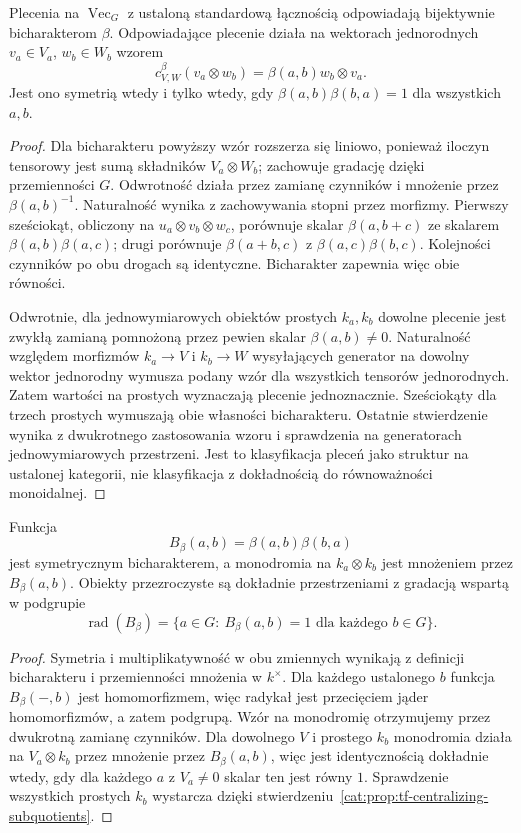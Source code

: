 \begin{twierdzenie}\label{cat:thm:tf-vec-braiding}
Plecenia na $\operatorname{Vec}_G$ z ustaloną standardową łącznością odpowiadają bijektywnie bicharakterom $\beta$. Odpowiadające plecenie działa na wektorach jednorodnych $v_a\in V_a$, $w_b\in W_b$ wzorem
\[
 c_{V,W}^{\beta}(v_a\otimes w_b)=\beta(a,b)w_b\otimes v_a.
\]
Jest ono symetrią wtedy i tylko wtedy, gdy $\beta(a,b)\beta(b,a)=1$ dla wszystkich $a,b$.
\end{twierdzenie}
\begin{proof}
Dla bicharakteru powyższy wzór rozszerza się liniowo, ponieważ iloczyn tensorowy jest sumą składników $V_a\otimes W_b$; zachowuje gradację dzięki przemienności $G$. Odwrotność działa przez zamianę czynników i mnożenie przez $\beta(a,b)^{-1}$. Naturalność wynika z zachowywania stopni przez morfizmy. Pierwszy sześciokąt, obliczony na $u_a\otimes v_b\otimes w_c$, porównuje skalar $\beta(a,b+c)$ ze skalarem $\beta(a,b)\beta(a,c)$; drugi porównuje $\beta(a+b,c)$ z $\beta(a,c)\beta(b,c)$. Kolejności czynników po obu drogach są identyczne. Bicharakter zapewnia więc obie równości.

Odwrotnie, dla jednowymiarowych obiektów prostych $k_a,k_b$ dowolne plecenie jest zwykłą zamianą pomnożoną przez pewien skalar $\beta(a,b)\neq0$. Naturalność względem morfizmów $k_a\to V$ i $k_b\to W$ wysyłających generator na dowolny wektor jednorodny wymusza podany wzór dla wszystkich tensorów jednorodnych. Zatem wartości na prostych wyznaczają plecenie jednoznacznie. Sześciokąty dla trzech prostych wymuszają obie własności bicharakteru. Ostatnie stwierdzenie wynika z dwukrotnego zastosowania wzoru i sprawdzenia na generatorach jednowymiarowych przestrzeni. Jest to klasyfikacja pleceń jako struktur na ustalonej kategorii, nie klasyfikacja z dokładnością do równoważności monoidalnej.
\end{proof}

\begin{wniosek}\label{cat:cor:tf-bicharacter-monodromy}
Funkcja
\[
 B_\beta(a,b)=\beta(a,b)\beta(b,a)
\]
jest symetrycznym bicharakterem, a monodromia na $k_a\otimes k_b$ jest mnożeniem przez $B_\beta(a,b)$. Obiekty przezroczyste są dokładnie przestrzeniami z gradacją wspartą w podgrupie
\[
 \operatorname{rad}(B_\beta)=\{a\in G:\ B_\beta(a,b)=1
 \text{ dla każdego }b\in G\}.
\]
\end{wniosek}
\begin{proof}
Symetria i multiplikatywność w obu zmiennych wynikają z definicji bicharakteru i przemienności mnożenia w $k^\times$. Dla każdego ustalonego $b$ funkcja $B_\beta(-,b)$ jest homomorfizmem, więc radykał jest przecięciem jąder homomorfizmów, a zatem podgrupą. Wzór na monodromię otrzymujemy przez dwukrotną zamianę czynników. Dla dowolnego $V$ i prostego $k_b$ monodromia działa na $V_a\otimes k_b$ przez mnożenie przez $B_\beta(a,b)$, więc jest identycznością dokładnie wtedy, gdy dla każdego $a$ z $V_a\neq0$ skalar ten jest równy $1$. Sprawdzenie wszystkich prostych $k_b$ wystarcza dzięki stwierdzeniu~\ref{cat:prop:tf-centralizing-subquotients}.
\end{proof}

